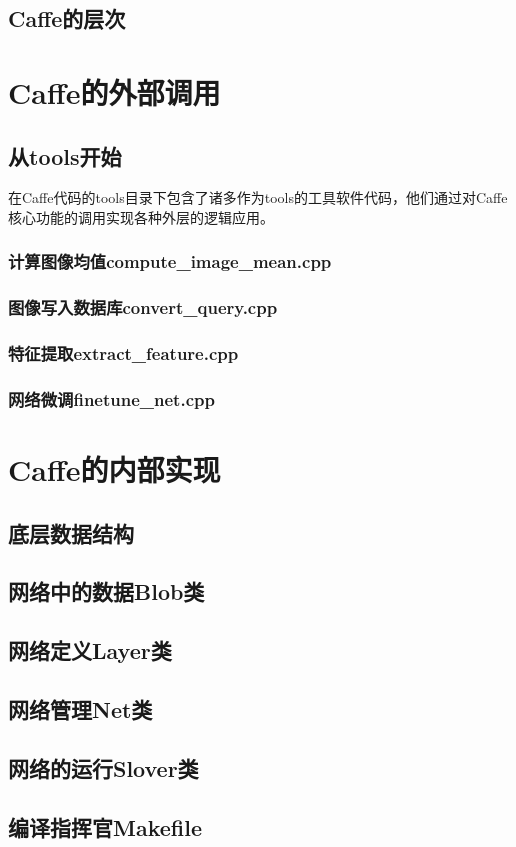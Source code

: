 \documentclass{NanCNBook}
\begin{document}
\chapter{Caffe的层次}

\part{Caffe的外部调用}

\chapter{从tools开始}
在Caffe代码的tools目录下包含了诸多作为tools的工具软件代码，他们通过对Caffe核心功能的调用实现各种外层的逻辑应用。

\section{计算图像均值compute\_image\_mean.cpp}

\section{图像写入数据库convert\_query.cpp}


                    



\section{特征提取extract\_feature.cpp}

\section{网络微调finetune\_net.cpp}

\part{Caffe的内部实现}
\chapter{底层数据结构}

\chapter{网络中的数据Blob类}

\chapter{网络定义Layer类}

\chapter{网络管理Net类}

\chapter{网络的运行Slover类}



\begin{cnappendix}
\chapter{编译指挥官Makefile}

\end{cnappendix}
\end{document}
